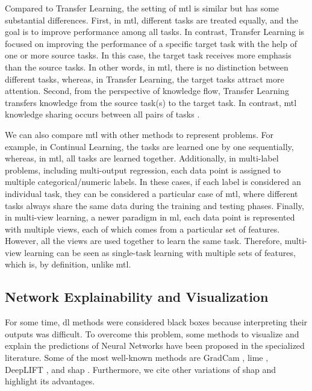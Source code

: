 Compared to Transfer Learning, the setting of \acs{mtl} is similar but has some substantial differences. First, in \acs{mtl}, different tasks are treated equally, and the goal is to improve performance among all tasks. In contrast, Transfer Learning is focused on improving the performance of a specific target task with the help of one or more source tasks. In this case, the target task receives more emphasis than the source tasks. In other words, in \acs{mtl}, there is no distinction between different tasks, whereas, in Transfer Learning, the target tasks attract more attention. Second, from the perspective of knowledge flow, Transfer Learning transfers knowledge from the source task(s) to the target task. In contrast, \acl{mtl} knowledge sharing occurs between all pairs of tasks \citep{zhang2017survey}.

We can also compare \acs{mtl} with other methods to represent problems. For example, in Continual Learning, the tasks are learned one by one sequentially, whereas, in \acs{mtl}, all tasks are learned together. Additionally, in multi-label problems, including multi-output regression, each data point is assigned to multiple categorical/numeric labels. In these cases, if each label is considered an individual task, they can be considered a particular case of \acl{mtl}, where different tasks always share the same data during the training and testing phases. Finally, in multi-view learning, a newer paradigm in \acl{ml}, each data point is represented with multiple views, each of which comes from a particular set of features. However, all the views are used together to learn the same task. Therefore, multi-view learning can be seen as single-task learning with multiple sets of features, which is, by definition, unlike \acs{mtl}.

\subsection{Network Explainability and Visualization}

For some time, \acl{dl} methods were considered black boxes because interpreting their outputs was difficult. To overcome this problem, some methods to visualize and explain the predictions of Neural Networks have been proposed in the specialized literature. Some of the most well-known methods are GradCam \citep{gradcam}, \acf{lime} \citep{lime}, DeepLIFT \citep{deeplift_old, deeplift_new}, and \acs{shap} \citep{shap2018}. 
 Furthermore, we cite other variations of \acs{shap} and highlight its advantages.


